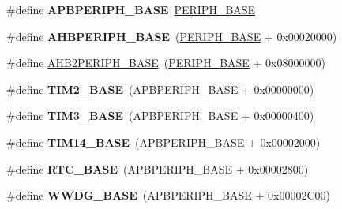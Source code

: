 \begin{DoxyCompactItemize}
\#define {\bfseries A\+P\+B\+P\+E\+R\+I\+P\+H\+\_\+\+B\+A\+SE}~\hyperlink{group___peripheral__memory__map_ga9171f49478fa86d932f89e78e73b88b0}{P\+E\+R\+I\+P\+H\+\_\+\+B\+A\+SE}
\item 
\mbox{\label{group___peripheral__memory__map_ga92eb5d49730765d2abd0f5b09548f9f5}} 
\#define {\bfseries A\+H\+B\+P\+E\+R\+I\+P\+H\+\_\+\+B\+A\+SE}~(\hyperlink{group___peripheral__memory__map_ga9171f49478fa86d932f89e78e73b88b0}{P\+E\+R\+I\+P\+H\+\_\+\+B\+A\+SE} + 0x00020000)
\item 
\#define \hyperlink{group___peripheral__memory__map_gaeedaa71d22a1948492365e2cd26cfd46}{A\+H\+B2\+P\+E\+R\+I\+P\+H\+\_\+\+B\+A\+SE}~(\hyperlink{group___peripheral__memory__map_ga9171f49478fa86d932f89e78e73b88b0}{P\+E\+R\+I\+P\+H\+\_\+\+B\+A\+SE} + 0x08000000)
\item 
\mbox{\label{group___peripheral__memory__map_ga00d0fe6ad532ab32f0f81cafca8d3aa5}} 
\#define {\bfseries T\+I\+M2\+\_\+\+B\+A\+SE}~(A\+P\+B\+P\+E\+R\+I\+P\+H\+\_\+\+B\+A\+SE + 0x00000000)
\item 
\mbox{\label{group___peripheral__memory__map_gaf0c34a518f87e1e505cd2332e989564a}} 
\#define {\bfseries T\+I\+M3\+\_\+\+B\+A\+SE}~(A\+P\+B\+P\+E\+R\+I\+P\+H\+\_\+\+B\+A\+SE + 0x00000400)
\item 
\mbox{\label{group___peripheral__memory__map_ga862855347d6e1d92730dfe17ee8e90b8}} 
\#define {\bfseries T\+I\+M14\+\_\+\+B\+A\+SE}~(A\+P\+B\+P\+E\+R\+I\+P\+H\+\_\+\+B\+A\+SE + 0x00002000)
\item 
\mbox{\label{group___peripheral__memory__map_ga4265e665d56225412e57a61d87417022}} 
\#define {\bfseries R\+T\+C\+\_\+\+B\+A\+SE}~(A\+P\+B\+P\+E\+R\+I\+P\+H\+\_\+\+B\+A\+SE + 0x00002800)
\item 
\mbox{\label{group___peripheral__memory__map_ga9a5bf4728ab93dea5b569f5b972cbe62}} 
\#define {\bfseries W\+W\+D\+G\+\_\+\+B\+A\+SE}~(A\+P\+B\+P\+E\+R\+I\+P\+H\+\_\+\+B\+A\+SE + 0x00002\+C00)
\item 
\mbox{\label{group___peripheral__memory__map_ga8543ee4997296af5536b007cd4748f55}} 

\end{DoxyCompactItemize}
